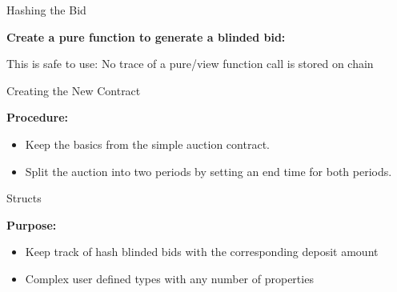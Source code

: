 \documentclass[]{beamer}
\begin{document}
\begin{frame}{Hashing the Bid}

	\textbf{Create a pure function to generate a blinded bid:}
	
	
	
	This is safe to use: No trace of a pure/view function call is stored on chain\\
	
\end{frame}

\begin{frame}[allowframebreaks]{Creating the New Contract}

	\textbf{Procedure:}
	
	\begin{itemize}
		\item Keep the basics from the simple auction contract.
		\item Split the auction into two periods by setting an end time for both periods.	
	\end{itemize}
	
	

\end{frame}

\begin{frame}{Structs}

	\textbf{Purpose:}
	
	\begin{itemize}
		\item Keep track of hash blinded bids with the corresponding deposit amount
		\item Complex user defined types with any number of properties
	\end{itemize}
	
	
	
	
\end{frame}
\end{document}
